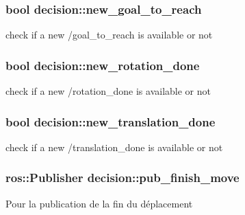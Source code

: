 \subsubsection[{\texorpdfstring{new\+\_\+goal\+\_\+to\+\_\+reach}{new_goal_to_reach}}]{\setlength{\rightskip}{0pt plus 5cm}bool decision\+::new\+\_\+goal\+\_\+to\+\_\+reach\hspace{0.3cm}{\ttfamily [private]}}\hypertarget{classdecision_a5e8a80eb8c5d11f884079c643754b0d8}{}\label{classdecision_a5e8a80eb8c5d11f884079c643754b0d8}
check if a new /goal\+\_\+to\+\_\+reach is available or not 
\subsubsection[{\texorpdfstring{new\+\_\+rotation\+\_\+done}{new_rotation_done}}]{\setlength{\rightskip}{0pt plus 5cm}bool decision\+::new\+\_\+rotation\+\_\+done\hspace{0.3cm}{\ttfamily [private]}}\hypertarget{classdecision_ae07d154e37ffd5bded5e957aab39aa3a}{}\label{classdecision_ae07d154e37ffd5bded5e957aab39aa3a}
check if a new /rotation\+\_\+done is available or not 
\subsubsection[{\texorpdfstring{new\+\_\+translation\+\_\+done}{new_translation_done}}]{\setlength{\rightskip}{0pt plus 5cm}bool decision\+::new\+\_\+translation\+\_\+done\hspace{0.3cm}{\ttfamily [private]}}\hypertarget{classdecision_ac07d8a1fb9e3ea92c94d06dc90ac892e}{}\label{classdecision_ac07d8a1fb9e3ea92c94d06dc90ac892e}
check if a new /translation\+\_\+done is available or not 
\subsubsection[{\texorpdfstring{pub\+\_\+finish\+\_\+move}{pub_finish_move}}]{\setlength{\rightskip}{0pt plus 5cm}ros\+::\+Publisher decision\+::pub\+\_\+finish\+\_\+move\hspace{0.3cm}{\ttfamily [private]}}\hypertarget{classdecision_af35e8bab2af3a5737120d14148aea79b}{}\label{classdecision_af35e8bab2af3a5737120d14148aea79b}
Pour la publication de la fin du déplacement 
